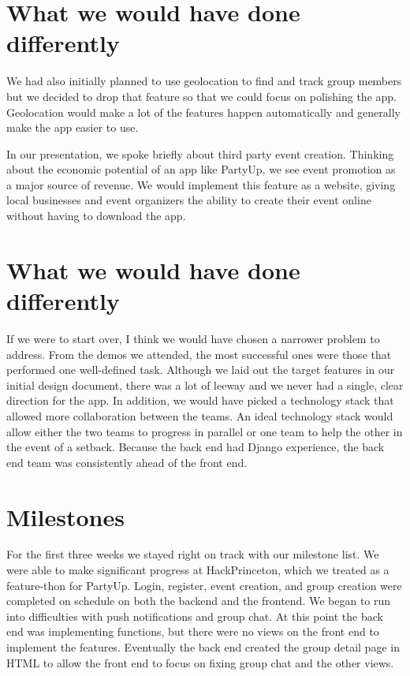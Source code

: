 \documentclass[12pt]{article}
\begin{document}
\section{What we would have done differently}

We had also initially planned to use geolocation to find and track group members but we decided to drop that feature so that we could focus on polishing the app. 
Geolocation would make a lot of the features happen automatically and generally make the app easier to use. 

In our presentation, we spoke briefly about third party event creation. 
Thinking about the economic potential of an app like PartyUp, we see event promotion as a major source of revenue. 
We would implement this feature as a website, giving local businesses and event organizers the ability to create their event online without having to download the app.

\section{What we would have done differently}

If we were to start over, I think we would have chosen a narrower problem to address. 
From the demos we attended, the most successful ones were those that performed one well-defined task. 
Although we laid out the target features in our initial design document, there was a lot of leeway and we never had a single, clear direction for the app.
In addition, we would have picked a technology stack that allowed more collaboration between the teams.
An ideal technology stack would allow either the two teams to progress in parallel or one team to help the other in the event of a setback. 
Because the back end had Django experience, the back end team was consistently ahead of the front end.

\section{Milestones}

For the first three weeks we stayed right on track with our milestone list. 
We were able to make significant progress at HackPrinceton, which we treated as a feature-thon for PartyUp. 
Login, register, event creation, and group creation were completed on schedule on both the backend and the frontend. 
We began to run into difficulties with push notifications and group chat. 
At this point the back end was implementing functions, but there were no views on the front end to implement the features. 
Eventually the back end created the group detail page in HTML to allow the front end to focus on fixing group chat and the other views. 
\end{document}
